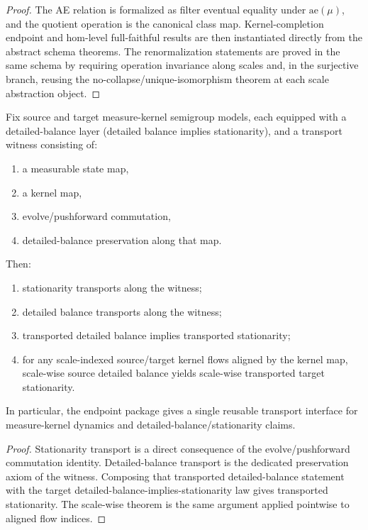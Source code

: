 \begin{proof}
The AE relation is formalized as filter eventual equality under $\mathrm{ae}(\mu)$, and the quotient operation is the canonical class map. Kernel-completion endpoint and hom-level full-faithful results are then instantiated directly from the abstract schema theorems. The renormalization statements are proved in the same schema by requiring operation invariance along scales and, in the surjective branch, reusing the no-collapse/unique-isomorphism theorem at each scale abstraction object.
\end{proof}

\begin{theorem}\label{thm:measure-kernel-db-stationary-transport}
Fix source and target measure-kernel semigroup models, each equipped with a detailed-balance layer (detailed balance implies stationarity), and a transport witness consisting of:
\begin{enumerate}
\item a measurable state map,
\item a kernel map,
\item evolve/pushforward commutation,
\item detailed-balance preservation along that map.
\end{enumerate}
Then:
\begin{enumerate}
\item stationarity transports along the witness;
\item detailed balance transports along the witness;
\item transported detailed balance implies transported stationarity;
\item for any scale-indexed source/target kernel flows aligned by the kernel map, scale-wise source detailed balance yields scale-wise transported target stationarity.
\end{enumerate}
In particular, the endpoint package gives a single reusable transport interface for measure-kernel dynamics and detailed-balance/stationarity claims.
\end{theorem}

\begin{proof}
Stationarity transport is a direct consequence of the evolve/pushforward commutation identity. Detailed-balance transport is the dedicated preservation axiom of the witness. Composing that transported detailed-balance statement with the target detailed-balance-implies-stationarity law gives transported stationarity. The scale-wise theorem is the same argument applied pointwise to aligned flow indices.
\end{proof}

